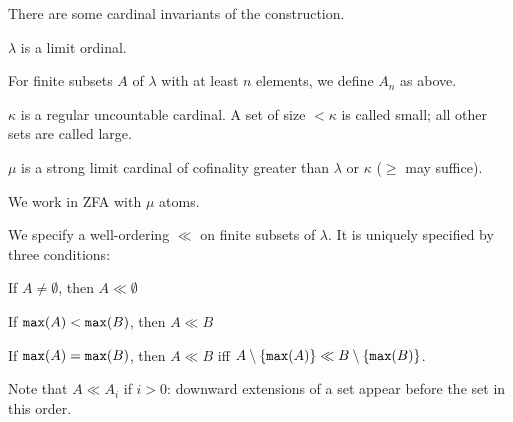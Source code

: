 \documentclass{slides}
\begin{document}
\begin{slide}

There are some cardinal invariants of the construction.

$\lambda$ is a limit ordinal.

For finite subsets $A$ of $\lambda$ with at least $n$ elements, we define $A_n$ as above.

$\kappa$ is a regular uncountable cardinal.  A set of size $<\kappa$ is called small;  all other sets are called large.

$\mu$ is a strong limit cardinal of cofinality greater than $\lambda$ or $\kappa$ ($\geq$ may suffice).

We work in ZFA with $\mu$ atoms.

\end{slide}

\begin{slide}

We specify a well-ordering $\ll$ on finite subsets of $\lambda$.    It is uniquely specified by three conditions:

\begin{description}

\item  If $A \neq \emptyset$, then $A \ll \emptyset$

\item  If ${\tt max}(A) < {\tt max}(B)$, then $A \ll B$

\item  If ${\tt max}(A) = {\tt max}(B)$, then $A \ll B$ iff $A \setminus \{{\tt max}(A)\} \ll B \setminus \{{\tt max}(B)\}$.

\end{description}

Note that $A \ll A_i$ if $i>0$:  downward extensions of a set appear before the set in this order.

\end{slide}
\end{document}
